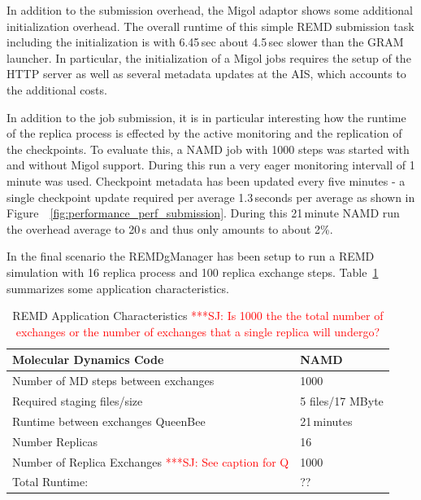 \documentclass[times, 10pt,twocolumn]{article}
\newcommand{\jhanote}[1]{ {\textcolor{red} { ***SJ: #1 }}}
\newcommand{\jhanote}[1]{}
\begin{document}
In addition to the submission overhead, the Migol adaptor shows some
additional initialization overhead. The overall runtime of this simple
REMD submission task including the initialization is with 6.45\,sec
about 4.5\,sec slower than the GRAM launcher. In particular, the
initialization of a Migol jobs requires the setup of the HTTP server
as well as several metadata updates at the AIS, which accounts to the
additional costs.
                                                                                                                     
In addition to the job submission, it is in particular interesting how
the runtime of the replica process is effected by the active
monitoring and the replication of the checkpoints.  To evaluate this,
a NAMD job with 1000 steps was started with and without Migol support.
During this run a very eager monitoring intervall of 1 minute was
used. Checkpoint metadata has been updated every five minutes - a
single checkpoint update required per average 1.3\,seconds per average
as shown in Figure~~\ref{fig:performance_perf_submission}.  During
this 21\,minute NAMD run the overhead average to 20\,s and thus only
amounts to about 2\%.

In the final scenario the REMDgManager has been setup to run a REMD
simulation with 16 replica process and 100 replica exchange
steps. Table~\ref{tab:app_stats} summarizes some application
characteristics.
\begin{table}        
    \centering
	\begin{tabular}{|p{5cm}|l|}
          \hline
          Molecular Dynamics Code &NAMD\\ \hline
          Number of MD steps between exchanges &1000\\ \hline 
          Required staging files/size &5 files/17 MByte\\ \hline
          Runtime between exchanges QueenBee &21\,minutes\\ \hline   
          Number Replicas &16 \\ \hline
          Number of Replica Exchanges \jhanote{See caption for Q} &1000\\ \hline
          Total Runtime: &??   \\ \hline
	\end{tabular}
	\caption{REMD Application Characteristics\label{tab:app_stats}
          \jhanote{Is 1000 the the total number of exchanges or the number of exchanges that a single replica will undergo?}}
\end{table}
\end{document}
